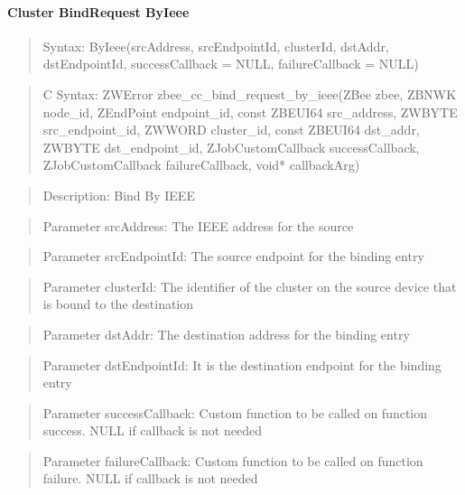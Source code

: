 \paragraph{Cluster BindRequest ByIeee}
\begin{quote}Syntax: ByIeee(srcAddress, srcEndpointId, clusterId, dstAddr, dstEndpointId, successCallback = NULL, failureCallback = NULL)\end{quote}
\begin{quote}C Syntax: ZWError zbee\_cc\_bind\_request\_by\_ieee(ZBee zbee, ZBNWK node\_id, ZEndPoint endpoint\_id, const ZBEUI64 src\_address, ZWBYTE src\_endpoint\_id, ZWWORD cluster\_id, const ZBEUI64 dst\_addr, ZWBYTE dst\_endpoint\_id, ZJobCustomCallback successCallback, ZJobCustomCallback failureCallback, void* callbackArg)\end{quote}
\begin{quote}Description: Bind By IEEE\end{quote}
\begin{quote}Parameter srcAddress: The IEEE address for the source\end{quote}
\begin{quote}Parameter srcEndpointId: The source endpoint for the binding entry\end{quote}
\begin{quote}Parameter clusterId: The identifier of the cluster on the source device that is bound to the destination\end{quote}
\begin{quote}Parameter dstAddr: The destination address for the binding entry\end{quote}
\begin{quote}Parameter dstEndpointId: It is the destination endpoint for the binding entry\end{quote}
\begin{quote}Parameter successCallback: Custom function to be called on function success. NULL if callback is not needed\end{quote}
\begin{quote}Parameter failureCallback: Custom function to be called on function failure. NULL if callback is not needed\end{quote}


